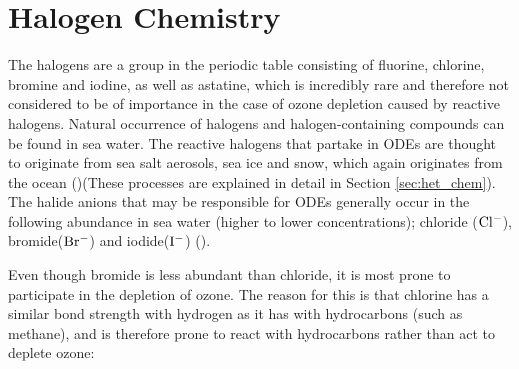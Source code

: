



\section{Halogen Chemistry}\label{sec:halogen_chemistry}


The halogens are a group in the periodic table consisting of fluorine, chlorine, bromine and iodine, as well as astatine, which is incredibly rare and therefore not considered to be of importance in the case of ozone depletion caused by reactive halogens. Natural occurrence of halogens and halogen-containing compounds can be found in sea water. The reactive halogens that partake in ODEs  are thought to originate from sea salt aerosols, sea ice and snow, which again originates from the ocean (\cite{Foster2001})(These processes are explained in detail in Section \ref{sec:het_chem}). The halide anions that may be responsible for ODEs generally occur in the following abundance in sea water (higher to lower concentrations); chloride ($\mathrm{Cl^-}$), bromide($\mathrm{Br^-}$) and iodide($\mathrm{I^-}$) (\cite{Simpson2015}). 

\medskip

Even though bromide is less abundant than chloride, it is most prone to participate in the depletion of ozone. The reason for this is that chlorine has a similar bond strength with hydrogen as it has with hydrocarbons (such as methane), and is therefore prone to react with hydrocarbons rather than act to deplete ozone: 

